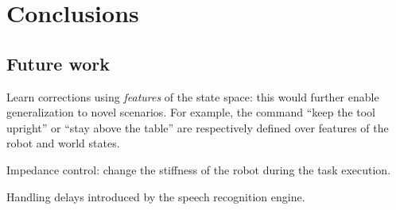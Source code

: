 \section{Conclusions}
\label{secConclusions}




\subsection{Future work}

Learn corrections using \emph{features} of the state space: this would further enable generalization to novel scenarios.
For example, the command ``keep the tool upright'' or ``stay above the table'' are respectively defined over features of the robot and world states.

Impedance control: change the stiffness of the robot during the task execution.


Handling delays introduced by the speech recognition engine.
